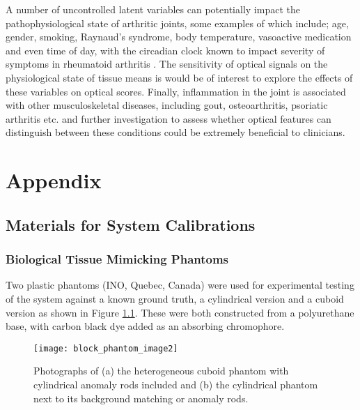 \documentclass[twoside]{bhamthesis}
\theoremstyle{definition}
\begin{document}
A number of uncontrolled latent variables can potentially impact the pathophysiological state of arthritic joints, some examples of which include; age, gender, smoking, Raynaud's syndrome, body temperature, vasoactive medication and even time of day, with the circadian clock known to impact severity of symptoms in rheumatoid arthritis \cite{gibbs2013role}. The sensitivity of optical signals on the physiological state of tissue means is would be of interest to explore the effects of these variables on optical scores. Finally, inflammation in the joint is associated with other musculoskeletal diseases, including gout, osteoarthritis, psoriatic arthritis etc. and further investigation to assess whether optical features can distinguish between these conditions could be extremely beneficial to clinicians.

\clearpage
\appendix
\chapter{Appendix}

\section{Materials for System Calibrations}

\subsection{Biological Tissue Mimicking Phantoms}

\label{appendix:Biological_Tissue_Mimicking_Phantoms}

Two plastic phantoms (INO, Quebec, Canada) were used for experimental testing of the system against a known ground truth, a cylindrical version and a cuboid version as shown in Figure \ref{fig:block_phantom_image}. These were both constructed from a polyurethane base, with carbon black dye added as an absorbing chromophore. 

\begin{figure}[!ht]
\centering
  \centering
  \texttt{[image: block\_phantom\_image2]}
  \caption{Photographs of (a) the heterogeneous cuboid phantom with cylindrical anomaly rods included and (b) the cylindrical phantom next to its background matching or anomaly rods.}
  \label{fig:block_phantom_image}
\end{figure}
\end{document}
